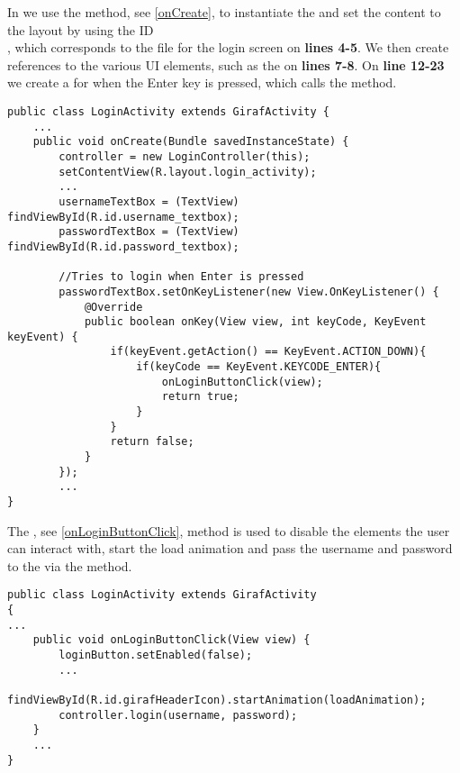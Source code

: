 In  we use the  method, see
\autoref{onCreate}, to instantiate the  and set the
content to the layout by using the ID \\, which
corresponds to the  file for the login screen on \textbf{lines 4-5}. We
then create references to the various UI elements, such as the 
on \textbf{lines 7-8}. On \textbf{line 12-23} we create a
 for when the Enter key is pressed, which calls the
 method.\nl

\begin{minipage}[H]{\linewidth}
\begin{lstlisting}[caption = \ttt{OnCreate} method for the \ttt{LoginActivity}
class, label = onCreate] 
public class LoginActivity extends GirafActivity {
	...
	public void onCreate(Bundle savedInstanceState) {
		controller = new LoginController(this);
    	setContentView(R.layout.login_activity);
		...
        usernameTextBox = (TextView) findViewById(R.id.username_textbox);
        passwordTextBox = (TextView) findViewById(R.id.password_textbox);
        
        //Tries to login when Enter is pressed
        passwordTextBox.setOnKeyListener(new View.OnKeyListener() {
            @Override
            public boolean onKey(View view, int keyCode, KeyEvent keyEvent) {
                if(keyEvent.getAction() == KeyEvent.ACTION_DOWN){
                    if(keyCode == KeyEvent.KEYCODE_ENTER){
                        onLoginButtonClick(view);
                        return true;
                    }
                }
                return false;
            }
        });
        ...
}
\end{lstlisting}
\end{minipage}

The , see \autoref{onLoginButtonClick}, method is used
to disable the elements the user can interact with, start the load animation and
pass the username and password to the  via the 
method.\nl

\begin{minipage}[H]{\linewidth}
\begin{lstlisting}[caption = Passes the user information and begins the waiting animation, label = onLoginButtonClick] 
public class LoginActivity extends GirafActivity 
{ 
...
	public void onLoginButtonClick(View view) {
        loginButton.setEnabled(false);
 		...
        findViewById(R.id.girafHeaderIcon).startAnimation(loadAnimation);
        controller.login(username, password);
    }
	...
}
\end{lstlisting}
\end{minipage}

